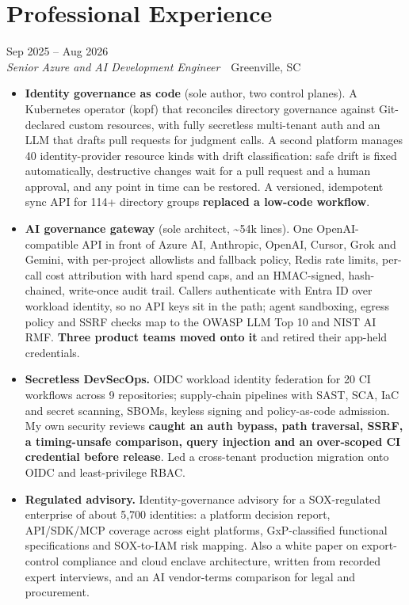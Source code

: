 \documentclass[10pt,letterpaper]{article}
\newcommand{\szmeta}{\fontsize{8pt}{10pt}\selectfont}
\begin{document}
\section*{Professional Experience}
\vspace{0pt}
 \hfill {\color{muted}\szmeta Sep 2025 – Aug 2026}\\[1pt]
{\itshape Senior Azure and AI Development Engineer}{\color{muted}\ \textbullet\ Greenville, SC}
\vspace{2pt}
\begin{itemize}
\item \textbf{Identity governance as code} {\color{muted}(sole author, two control planes)}. A Kubernetes operator (kopf) that reconciles directory governance against Git-declared custom resources, with fully secretless multi-tenant auth and an LLM that drafts pull requests for judgment calls. A second platform manages 40 identity-provider resource kinds with drift classification: safe drift is fixed automatically, destructive changes wait for a pull request and a human approval, and any point in time can be restored. A versioned, idempotent sync API for 114+ directory groups \textbf{replaced a low-code workflow}.
\item \textbf{AI governance gateway} {\color{muted}(sole architect, \textasciitilde{}54k lines)}. One OpenAI-compatible API in front of Azure AI, Anthropic, OpenAI, Cursor, Grok and Gemini, with per-project allowlists and fallback policy, Redis rate limits, per-call cost attribution with hard spend caps, and an HMAC-signed, hash-chained, write-once audit trail. Callers authenticate with Entra ID over workload identity, so no API keys sit in the path; agent sandboxing, egress policy and SSRF checks map to the OWASP LLM Top 10 and NIST AI RMF. \textbf{Three product teams moved onto it} and retired their app-held credentials.
\item \textbf{Secretless DevSecOps.} OIDC workload identity federation for 20 CI workflows across 9 repositories; supply-chain pipelines with SAST, SCA, IaC and secret scanning, SBOMs, keyless signing and policy-as-code admission. My own security reviews \textbf{caught an auth bypass, path traversal, SSRF, a timing-unsafe comparison, query injection and an over-scoped CI credential before release}. Led a cross-tenant production migration onto OIDC and least-privilege RBAC.
\item \textbf{Regulated advisory.} Identity-governance advisory for a SOX-regulated enterprise of about 5,700 identities: a platform decision report, API/SDK/MCP coverage across eight platforms, GxP-classified functional specifications and SOX-to-IAM risk mapping. Also a white paper on export-control compliance and cloud enclave architecture, written from recorded expert interviews, and an AI vendor-terms comparison for legal and procurement.

\end{itemize}
\end{document}
